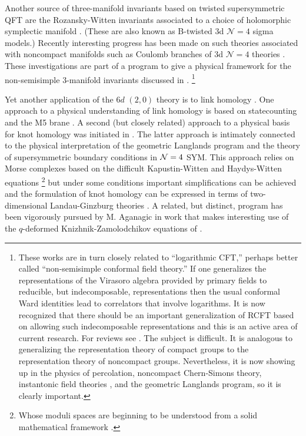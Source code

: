 \documentclass[12pt]{article}
\newcommand\CalN{\mathcal{N}}
\begin{document}
 
Another source of three-manifold invariants based on twisted supersymmetric QFT are the Rozansky-Witten invariants associated to a choice of holomorphic symplectic manifold
\cite{Kapranov-RW,Rozansky:1996bq}. (These are also known as B-twisted 3d ${\CalN}=4$ sigma models.)  Recently interesting progress has been made on such theories associated with noncompact manifolds such as Coulomb branches of 3d ${\CalN}=4$ theories \cite{Brunner:2022rpd,Creutzig:2021ext,Gukov:2020lqm}. These investigations are part of a program to give a physical framework for the 
non-semisimple 3-manifold invariants discussed in \cite{Costantino:2012it,Hennings,kashaev2002invariants,Lyubashenko:1994tm}.
%
\footnote{These works are in turn closely related to ``logarithmic CFT,'' 
perhaps better called ``non-semisimple conformal field theory.'' 
If one generalizes the representations of the Virasoro algebra provided by 
primary fields to reducible, but indecomposable, representations then the usual conformal Ward identities lead to correlators that involve logarithms. 
It is now recognized that there should be an important generalization of RCFT based on allowing such indecomposable representations and this is an active area of current research. For reviews see \cite{Creutzig:2013hma,Flohr:2001zs,Fuchs:2019xkv,
Gaberdiel:2001tr,Kawai:2002fu}. The subject is difficult. It is analogous to generalizing 
the representation theory of compact groups to the representation theory of noncompact groups. 
Nevertheless, it is now showing up in the physics of percolation, noncompact Chern-Simons theory, instantonic field theories \cite{Frenkel:2006fy, Frenkel:2008vz},
and the geometric Langlands program, so it is clearly important. 
} 
 

Yet another application of the $6d$ $(2,0)$ theory is to link homology   
\cite{Bar-Natan-KnotHom,KhovanovHomology}. One approach to a physical understanding of 
link homology is based on statecounting and the M5 brane 
\cite{Gorsky:2013jxa,Gukov:2004hz,Gukov:2010agg, Gukov:2012jx,Gukov:2016mqo,Gukov:2016gkn}. 
A second (but closely related) approach to a physical basis for knot homology was initiated in \cite{Witten:2011zz,Witten:2014xwa}. The latter approach is intimately connected to the physical interpretation of the geometric Langlands program and the theory of supersymmetric boundary conditions in ${\cal{N}}=4$ SYM. This approach relies on Morse complexes based on the difficult Kapustin-Witten and Haydys-Witten equations
%
\footnote{Whose moduli spaces are beginning to be understood from a solid mathematical framework
\cite{Mazzeo:2013zga,Mazzeo:2017qwz,
Taubes:2017pzr,Taubes:2019zhd,Taubes:2021clf}.}
%
but under some conditions important simplifications can be achieved and the formulation of knot homology can be expressed in terms of two-dimensional Landau-Ginzburg theories \cite{Gaiotto:2011nm,Gaiotto:2015aoa,Galakhov:2016cji}. 
A related, but distinct, program has been vigorously pursued by M. Aganagic  \cite{Aganagic:2020olg,Aganagic:2021ubp}
in work that makes interesting use 
\cite{Aganagic:2016jmx,Aganagic:2017smx,Aganagic:2017gsx} of the 
$q$-deformed Knizhnik-Zamolodchikov equations of 
\cite{Frenkel:1991gx}. 
\end{document}
